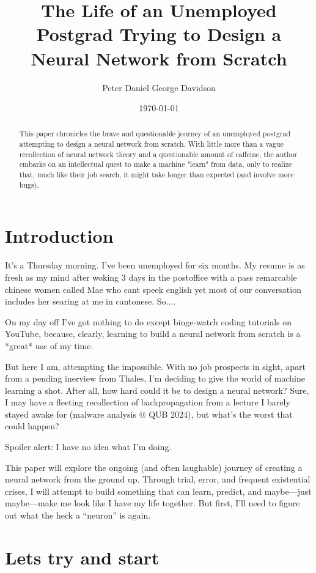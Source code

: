\documentclass[12pt]{article}
\title{The Life of an Unemployed Postgrad Trying to Design a Neural Network from Scratch}
\author{Peter Daniel George Davidson}
\date{\today}
\begin{document}
\maketitle

\begin{abstract}
    This paper chronicles the brave and questionable journey of an unemployed postgrad attempting to design a neural network from scratch. With little more than a vague recollection of neural network theory and a questionable amount of caffeine, the author embarks on an intellectual quest to make a machine "learn" from data, only to realize that, much like their job search, it might take longer than expected (and involve more bugs).
\end{abstract}

\section{Introduction}

It’s a Thursday morning. I’ve been unemployed for six months. My resume is as fresh as my mind after woking 3 days in the postoffice with a pass remarcable chinese women called Mae who cant speek english yet most of our conversation includes her searing at me in cantonese. So....

On my day off I’ve got nothing to do except binge-watch coding tutorials on YouTube, 
because, clearly, learning to build a neural network from scratch is a *great* use of my time.

But here I am, attempting the impossible. With no job prospects in sight, apart from a pending inerview from Thales, I'm deciding to give the world of machine learning a shot. After all, how hard could it be to design a neural network? Sure, I may have a fleeting recollection of backpropagation from a lecture I barely stayed awake for (malware analysis @ QUB 2024), but what’s the worst that could happen?

Spoiler alert: I have no idea what I’m doing.

This paper will explore the ongoing (and often laughable) journey of creating a neural network from the ground up. Through trial, error, and frequent existential crises, I will attempt to build something that can learn, predict, and maybe—just maybe—make me look like I have my life together. But first, I’ll need to figure out what the heck a “neuron” is again.

\section{Lets try and start}
\end{document}
